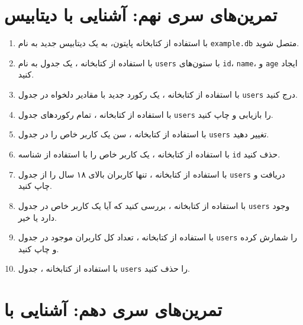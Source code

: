 \documentclass[a4paper,12pt]{article}
\begin{document}
	
	
	
	\newpage
	\section*{تمرین‌های سری نهم: آشنایی با دیتابیس}
	
	\begin{enumerate}
		\item با استفاده از کتابخانه  پایتون، به یک دیتابیس جدید به نام \texttt{example.db} متصل شوید.
		\item با استفاده از کتابخانه ، یک جدول به نام \texttt{users} با ستون‌های \texttt{id}، \texttt{name}، و \texttt{age} ایجاد کنید.
		\item با استفاده از کتابخانه ، یک رکورد جدید با مقادیر دلخواه در جدول \texttt{users} درج کنید.
		\item با استفاده از کتابخانه ، تمام رکوردهای جدول \texttt{users} را بازیابی و چاپ کنید.
		\item با استفاده از کتابخانه ، سن یک کاربر خاص را در جدول \texttt{users} تغییر دهید.
		\item با استفاده از کتابخانه ، یک کاربر خاص را با استفاده از شناسه \texttt{id} حذف کنید.
		\item با استفاده از کتابخانه ، تنها کاربران بالای ۱۸ سال را از جدول \texttt{users} دریافت و چاپ کنید.
		\item با استفاده از کتابخانه ، بررسی کنید که آیا یک کاربر خاص در جدول \texttt{users} وجود دارد یا خیر.
		\item با استفاده از کتابخانه ، تعداد کل کاربران موجود در جدول \texttt{users} را شمارش کرده و چاپ کنید.
		\item با استفاده از کتابخانه ، جدول \texttt{users} را حذف کنید.
	\end{enumerate}
	
	\newpage
	\section*{تمرین‌های سری دهم: آشنایی با}
	
\end{document}
